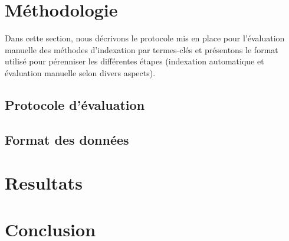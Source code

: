 
  \section{Méthodologie}
  \label{section:main-automatic_evaluation_of_keyphrase_annotation-methodology}
    Dans cette section, nous décrivons le protocole mis en place pour
    l'évaluation manuelle des méthodes d'indexation par termes-clés et
    présentons le format utilisé pour pérenniser les différentes étapes
    (indexation automatique et évaluation manuelle selon divers aspects).

    \subsection{Protocole d'évaluation}
    \label{subsec:main-automatic_evaluation_of_keyphrase_annotation-methodology-evaluation_protocol}

    \subsection{Format des données}
    \label{subsec:main-automatic_evaluation_of_keyphrase_annotation-methodology-data_format}


  \section{Resultats}
  \label{sec:main-automatic_evaluation_of_keyphrase_annotation-results}
    


    \TODO{\dots}


  \section{Conclusion}
  \label{sec:main-automatic_evaluation_of_keyphrase_annotation-Conclusion}

